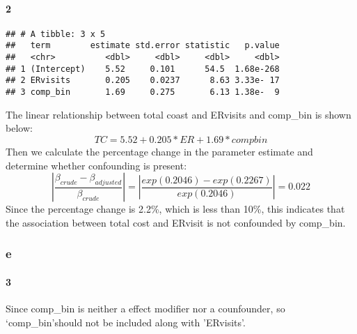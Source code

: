 \documentclass[]{article}
\newenvironment{Shaded}{\begin{snugshade}}{\end{snugshade}}
\newcommand{\KeywordTok}[1]{\textcolor[rgb]{0.13,0.29,0.53}{\textbf{#1}}}
\newcommand{\DataTypeTok}[1]{\textcolor[rgb]{0.13,0.29,0.53}{#1}}
\newcommand{\DecValTok}[1]{\textcolor[rgb]{0.00,0.00,0.81}{#1}}
\newcommand{\StringTok}[1]{\textcolor[rgb]{0.31,0.60,0.02}{#1}}
\newcommand{\OperatorTok}[1]{\textcolor[rgb]{0.81,0.36,0.00}{\textbf{#1}}}
\newcommand{\NormalTok}[1]{#1}
\let\oldparagraph\paragraph
\renewcommand{\paragraph}[1]{\oldparagraph{#1}\mbox{}}
\begin{document}
\paragraph{2}\label{section}

\begin{Shaded}
\end{Shaded}

\begin{verbatim}
## # A tibble: 3 x 5
##   term        estimate std.error statistic   p.value
##   <chr>          <dbl>     <dbl>     <dbl>     <dbl>
## 1 (Intercept)    5.52     0.101      54.5  1.68e-268
## 2 ERvisits       0.205    0.0237      8.63 3.33e- 17
## 3 comp_bin       1.69     0.275       6.13 1.38e-  9
\end{verbatim}

The linear relationship between total coast and ERvisits and comp\_bin
is shown below: \[
TC = 5.52 + 0.205*ER + 1.69*compbin
\] Then we calculate the percentage change in the parameter estimate and
determine whether confounding is present: \[
\left\lvert{\frac{\beta_{crude} - \beta_{adjusted}}{\beta_{crude}}} \right\rvert= \left\rvert\frac{exp(0.2046) - exp(0.2267)}{exp(0.2046)}\right\rvert = 0.022
\] Since the percentage change is 2.2\%, which is less than 10\%, this
indicates that the association between total cost and ERvisit is not
confounded by comp\_bin.

\subsubsection{e}\label{e-2}

\paragraph{3}\label{section-1}

Since comp\_bin is neither a effect modifier nor a counfounder, so
`comp\_bin'should not be included along with 'ERvisits'.
\end{document}
